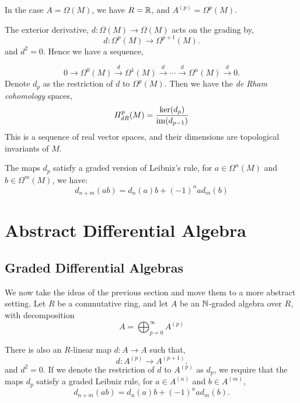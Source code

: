 In the case $A = \Omega(M)$, we have $R = \mathbb{R}$, and $A^{(p)} = \Omega^p(M)$.

The exterior derivative, $d:\Omega(M)\rightarrow \Omega(M)$ acts on the grading by,
\begin{equation*}
    d:\Omega^p(M) \rightarrow \Omega^{p+1}(M).
\end{equation*}
and $d^2 = 0$. Hence we have a sequence,

\begin{equation*}
    0\rightarrow \Omega^{0}(M) \xrightarrow{d} \Omega^1(M) \xrightarrow{d} \cdots \xrightarrow{d} \Omega^n(M) \xrightarrow{d} 0.
\end{equation*}
Denote $d_p$ as the restriction of $d$ to $\Omega^p(M)$. Then we have the \emph{de Rham cohomology}
spaces,
\begin{equation*}
    H^p_{dR}(M) = \frac{\ker(d_{p})}{\operatorname{im}(d_{p-1})}
\end{equation*}
This is a sequence of real vector spaces, and their dimensions are topological
invariants of $M$.

The maps $d_p$ satisfy a graded version of Leibniz's rule, for $a \in \Omega^n(M)$
and $b \in \Omega^m(M)$, we have:
\begin{equation*}
    d_{n+m}(ab) = d_n(a)b+(-1)^nad_m(b)
\end{equation*}

\section{Abstract Differential Algebra}
\subsection{Graded Differential Algebras}
We now take the ideas of the previous section and move them to a more abstract setting.
Let $R$ be a commutative ring, and let $A$ be an $\mathbb{N}$-graded algebra over $R$, with decomposition
\begin{equation*}
    A = \bigoplus_{p=0}^\infty A^{(p)}
\end{equation*}

There is also an $R$-linear map $d:A\rightarrow A$ such that,
\begin{equation*}
    d:A^{(p)}\rightarrow A^{(p+1)}.
\end{equation*}
and $d^2 = 0$.
If we denote the restriction of $d$ to $A^{(p)}$ as $d_p$, we
require that the maps $d_p$ satisfy a graded Leibniz rule, for $a \in A^{(n)}$
and $b \in A^{(m)}$,
\begin{equation*}
    d_{n+m}(ab) = d_n(a)b+(-1)^nad_m(b).
\end{equation*}

